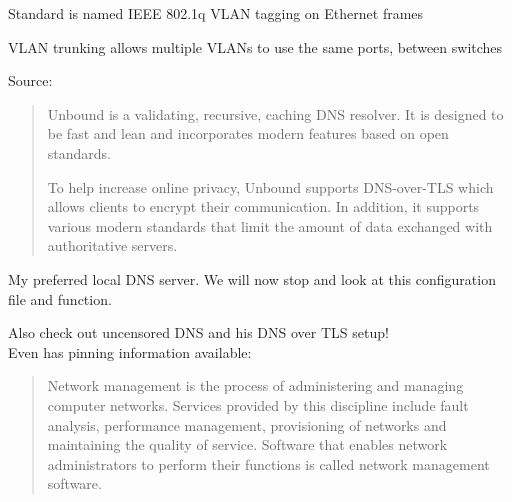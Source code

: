 \documentclass[Screen16to9,17pt]{foils}
\begin{document}


\begin{list1}
\item Standard is named IEEE 802.1q VLAN tagging  on Ethernet frames
\item VLAN trunking allows multiple VLANs to use the same ports, between switches
\end{list1}



Source:\\{\footnotesize
{}}


\begin{quote}
Unbound is a validating, recursive, caching DNS resolver. It is designed to be fast and lean and incorporates modern features based on open standards.

To help increase online privacy, Unbound supports DNS-over-TLS which allows clients to encrypt their communication. In addition, it supports various modern standards that limit the amount of data exchanged with authoritative servers.
\end{quote}


My preferred local DNS server. We will now stop and look at this configuration file and function.

Also check out uncensored DNS and his DNS over TLS setup!\\
Even has pinning information available:\\ {\small{}}



\begin{quote}
Network management is the process of administering and managing computer networks. Services provided by this discipline include fault analysis, performance management, provisioning of networks and maintaining the quality of service. Software that enables network administrators to perform their functions is called network management software.\\
\end{quote}
\end{document}
